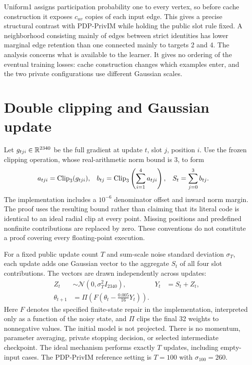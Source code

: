 Uniform1 assigns participation probability one to every vertex, so before cache construction it exposes $c_{uv}$ copies of each input edge. This gives a precise structural contrast with PDP-PrivIM while holding the public slot rule fixed. A neighborhood consisting mainly of edges between strict identities has lower marginal edge retention than one connected mainly to targets 2 and 4. The analysis concerns what is available to the learner. It gives no ordering of the eventual training losses: cache construction changes which examples enter, and the two private configurations use different Gaussian scales.

\section{Double clipping and Gaussian update}
Let $g_{tji}\in\mathbb{R}^{2340}$ be the full gradient at update $t$, slot $j$, position $i$. Use the frozen clipping operation, whose real-arithmetic norm bound is 3, to form
\begin{align}
 a_{tji}&=\operatorname{Clip}_{3}(g_{tji}), &
 b_{tj}&=\operatorname{Clip}_{3}\left(\sum_{i=1}^{4}a_{tji}\right), &
 S_t&=\sum_{j=0}^{3}b_{tj}.\label{eq:doubleclip}
\end{align}
The implementation includes a $10^{-6}$ denominator offset and inward norm margin. The proof uses the resulting bound rather than claiming that its literal code is identical to an ideal radial clip at every point. Missing positions and predefined nonfinite contributions are replaced by zero. These conventions do not constitute a proof covering every floating-point execution.

For a fixed public update count $T$ and sum-scale noise standard deviation $\sigma_T$, each update adds one Gaussian vector to the aggregate $S_t$ of all four slot contributions. The vectors are drawn independently across updates:
\begin{align}
 Z_t&\sim\mathcal{N}(0,\sigma_T^2I_{2340}), &Y_t&=S_t+Z_t,\\
 \theta_{t+1}&=\Pi\!\left(F\left(\theta_t-\frac{0.005}{16}Y_t\right)\right).
 \label{eq:update}
\end{align}
Here $F$ denotes the specified finite-state repair in the implementation, interpreted only as a function of the noisy state, and $\Pi$ clips the final 32 weights to nonnegative values. The initial model is not projected. There is no momentum, parameter averaging, private stopping decision, or selected intermediate checkpoint. The ideal mechanism performs exactly $T$ updates, including empty-input cases. The PDP-PrivIM reference setting is $T=100$ with $\sigma_{100}=260$.

